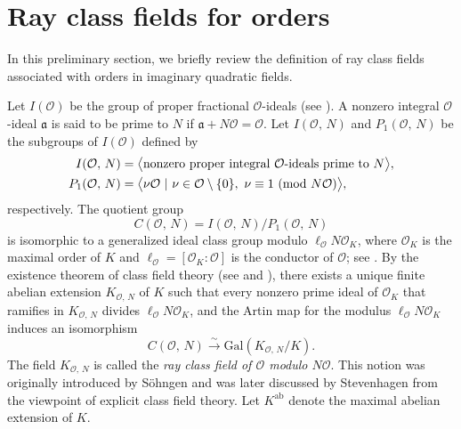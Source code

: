 \documentclass[reqno,11pt]{article}
\newcommand{\Mod}[1]{\ (\textup{mod}\ #1)}
\theoremstyle{plain} %
\theoremstyle{definition} %
\begin{document}
\section {Ray class fields for orders}

In this preliminary section, we briefly review 
the definition of ray class fields associated with orders in imaginary quadratic fields. 
\par
Let $I(\mathcal{O})$ be the group of proper fractional $\mathcal{O}$-ideals 
(see \cite[$\S$7.A]{Cox}). 
A nonzero integral $\mathcal{O}$-ideal $\mathfrak{a}$ is said to be prime to 
$N$ if $\mathfrak{a}+N\mathcal{O}=\mathcal{O}$. 
Let $I(\mathcal{O},\,N)$ and $P_1(\mathcal{O},\,N)$ be the subgroups of $I(\mathcal{O})$ 
defined by
\begin{align*}
I(\mathcal{O},\,N)&=\bigl\langle\text{nonzero proper integral $\mathcal{O}$-ideals
prime to $N$}\bigr\rangle,\\
P_1(\mathcal{O},\,N)&=\bigl\langle\nu\mathcal{O}~|~
\nu\in\mathcal{O}\setminus\{0\},~
\nu\equiv1\Mod{N\mathcal{O}}\bigr\rangle,
\end{align*}
respectively. The quotient group 
\begin{equation*}
C(\mathcal{O},\,N)=
I(\mathcal{O},\,N)/P_1(\mathcal{O},\,N)
\end{equation*}
is isomorphic to a generalized 
ideal class group modulo $\ell_\mathcal{O} N\mathcal{O}_K$,
where $\mathcal{O}_K$ is the maximal order of  $K$ and
$\ell_\mathcal{O}=[\mathcal{O}_K:\mathcal{O}]$ is the conductor of $\mathcal{O}$; 
see \cite[Theorem 3.18]{Schertz}. By the existence
theorem of class field theory (see
\cite[$\S$V.9]{Janusz} and \cite[$\S$2]{J-K-S-Y}), there exists
a unique finite abelian extension $K_{\mathcal{O},\,N}$ of $K$
such that every nonzero prime ideal of $\mathcal{O}_K$ that ramifies in 
$K_{\mathcal{O},\,N}$ divides $\ell_\mathcal{O} N\mathcal{O}_K$,
and the Artin map for the modulus $\ell_\mathcal{O} N\mathcal{O}_K$ induces an isomorphism 
\begin{equation*}
C(\mathcal{O},\,N)\stackrel{\sim}{\rightarrow}
\mathrm{Gal}(K_{\mathcal{O},\,N}/K). 
\end{equation*}
The field $K_{\mathcal{O},\,N}$ is called the 
\textit{ray class field of $\mathcal{O}$ modulo $N\mathcal{O}$}.
This notion was originally introduced by S\"{o}hngen \cite{Sohngen}
and was later discussed by Stevenhagen \cite{Stevenhagen} from
the viewpoint of 
explicit class field theory. Let 
$K^\mathrm{ab}$ denote the maximal abelian extension of $K$.
\end{document}
